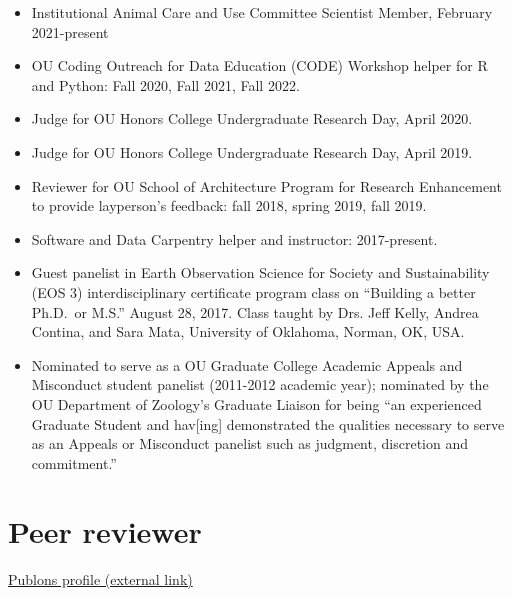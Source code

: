 \documentclass[
  letterpaper,
  DIV=11,
  numbers=noendperiod,
  oneside]{scrreprt}
\providecommand{\tightlist}{%
  \setlength{\itemsep}{0pt}\setlength{\parskip}{0pt}}\usepackage{longtable,booktabs,array}
\begin{document}
\begin{itemize}
\tightlist
\item
  Institutional Animal Care and Use Committee Scientist Member, February
  2021-present
\item
  OU Coding Outreach for Data Education (CODE) Workshop helper for R and
  Python: Fall 2020, Fall 2021, Fall 2022.
\item
  Judge for OU Honors College Undergraduate Research Day, April 2020.
\item
  Judge for OU Honors College Undergraduate Research Day, April 2019.
\item
  Reviewer for OU School of Architecture Program for Research
  Enhancement to provide layperson's feedback: fall 2018, spring 2019,
  fall 2019.
\item
  Software and Data Carpentry helper and instructor: 2017-present.
\item
  Guest panelist in Earth Observation Science for Society and
  Sustainability (EOS 3) interdisciplinary certificate program class on
  ``Building a better Ph.D.~or M.S.'' August 28, 2017. Class taught by
  Drs. Jeff Kelly, Andrea Contina, and Sara Mata, University of
  Oklahoma, Norman, OK, USA.
\item
  Nominated to serve as a OU Graduate College Academic Appeals and
  Misconduct student panelist (2011-2012 academic year); nominated by
  the OU Department of Zoology's Graduate Liaison for being ``an
  experienced Graduate Student and hav{[}ing{]} demonstrated the
  qualities necessary to serve as an Appeals or Misconduct panelist such
  as judgment, discretion and commitment.''
\end{itemize}

\section{Peer reviewer}\label{peer-reviewer}

\href{https://publons.com/a/1187905/}{Publons profile (external link)}
\end{document}

